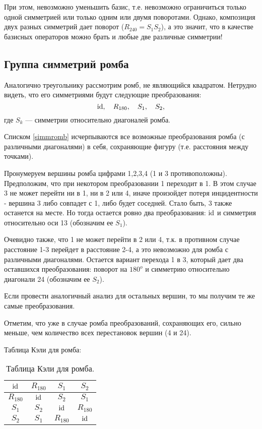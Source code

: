 При этом, невозможно уменьшить базис, т.е. невозможно ограничиться только одной симметрией или только одним или двумя поворотами. Однако, композиция двух разных симметрий дает поворот ($R_{240}=S_1S_2$), а это значит, что в качестве базисных операторов можно брать и любые две различные симметрии!



\subsection{Группа симметрий ромба}

Аналогично треугольнику рассмотрим ромб, не являющийся квадратом. Нетрудно видеть, что его симметриями будут следующие преобразования:
\begin{equation}\label{simmromb}
\mathrm{id},\quad R_{180},\quad S_1,\quad S_2,
\end{equation}
где $S_k$ --- симметрии относительно диагоналей ромба.

\begin{thrm}
Списком \eqref{simmromb} исчерпываются все возможные преобразования ромба (с различными диагоналями) в себя, сохраняющие фигуру (т.е. расстояния между точками).
\end{thrm}
\pf
Пронумеруем вершины ромба цифрами 1,2,3,4 (1 и 3 противоположны). Предположим, что при некотором преобразовании 1 переходит в 1. В этом случае 3 не может перейти ни в 1, ни в 2 или 4, иначе произойдет потеря инцидентности - вершина 3 либо совпадет с 1, либо будет соседней. Стало быть, 3 также останется на месте. Но тогда остается ровно два преобразования: $\mathrm{id}$ и симметрия относительно оси 13 (обозначим ее $S_1$).

Очевидно также, что 1 не может перейти в 2 или 4, т.к. в противном случае расстояние 1-3 перейдет в расстояние 2-4, а это невозможно для ромба с различными диагоналями. Остается вариант перехода 1 в 3, который дает два оставшихся преобразования: поворот на $180^o$ и симметрию относительно диагонали 24 (обозначим ее $S_2$).

Если провести аналогичный анализ для остальных вершин, то мы получим те же самые преобразования.
\epf

Отметим, что уже в случае ромба преобразований, сохраняющих его, сильно меньше, чем количество всех перестановок вершин (4 и 24).

Таблица Кэли для ромба:
\begin{table}[htb!]\begin{center}
\begin{tabular}{c|c|c|c|}
$\mathrm{id}$     & $R_{180}$ & $S_1$ & $S_2$ \\
\hline
$R_{180}$ & $\mathrm{id}$     & $S_2$ & $S_1$ \\
\hline
$S_1$     & $S_2$     & $\mathrm{id}$ & $R_{180}$ \\
\hline
$S_2$     & $S_1$     & $R_{180}$ & $\mathrm{id}$ \\
\hline
\end{tabular}
\caption{Таблица Кэли для ромба.}\label{rombus}
\end{center}\end{table}

